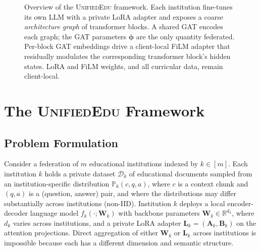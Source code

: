 \documentclass[11pt]{article}
\theoremstyle{plain}
\theoremstyle{definition}
\theoremstyle{remark}
\newcommand{\UniEdu}{\textsc{UnifiedEdu}}
\begin{document}
\begin{figure}[t]
\caption{Overview of the \UniEdu{} framework. Each
institution fine-tunes its own LLM with a private LoRA
adapter and exposes a coarse \emph{architecture graph}
of transformer blocks. A shared GAT encodes each
graph; the GAT parameters $\boldsymbol{\phi}$ are the
only quantity federated. Per-block GAT embeddings drive
a client-local FiLM adapter that residually modulates
the corresponding transformer block's hidden states.
LoRA and FiLM weights, and all curricular data, remain
client-local.}
\label{fig:unifiededu_concept}
\end{figure}

\section{The \UniEdu{} Framework}
\label{sec:method}

\subsection{Problem Formulation}
\label{sec:problem}

Consider a federation of $m$ educational institutions
indexed by $k \in [m]$. Each institution $k$ holds a
private dataset $\mathcal{D}_k$ of educational
documents sampled from an institution-specific
distribution $\mathbb{P}_k(c, q, a)$, where $c$ is a
context chunk and $(q, a)$ is a (question, answer)
pair, and where the distributions may differ
substantially across institutions (non-IID).
Institution $k$ deploys a local encoder-decoder
language model $f_k(\cdot;\mathbf{W}_k)$ with
backbone parameters $\mathbf{W}_k \in \mathbb{R}^{d_k}$,
where $d_k$ varies across institutions, and a private
LoRA adapter $\mathbf{L}_k = (\mathbf{A}_k,
\mathbf{B}_k)$ on the attention projections.
Direct aggregation of either $\mathbf{W}_k$ or
$\mathbf{L}_k$ across institutions is impossible
because each has a different dimension and semantic
structure.
\end{document}
